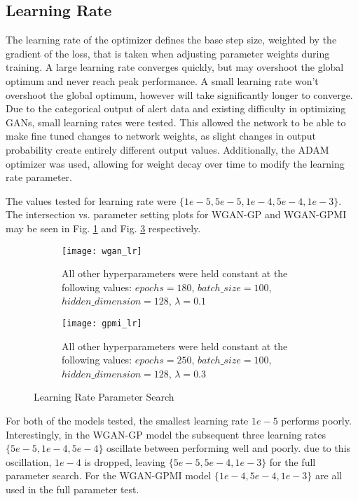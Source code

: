 \subsection{Learning Rate}
\label{sec:lr}

The learning rate of the optimizer defines the base step size, weighted by the gradient of the loss, that is taken when adjusting parameter weights during training. A large learning rate converges quickly, but may overshoot the global optimum and never reach peak performance. A small learning rate won't overshoot the global optimum, however will take significantly longer to converge. Due to the categorical output of alert data and existing difficulty in optimizing GANs, small learning rates were tested. This allowed the network to be able to make fine tuned changes to network weights, as slight changes in output probability create entirely different output values. Additionally, the ADAM optimizer was used, allowing for weight decay over time to modify the learning rate parameter.


The values tested for learning rate were $\{1e-5, 5e-5, 1e-4, 5e-4, 1e-3\}$. The intersection vs. parameter setting plots for WGAN-GP and WGAN-GPMI may be seen in Fig. \ref{fig:wgan_lr} and Fig. \ref{fig:gpmi_lr} respectively.

\begin{figure}[!htbp]
	\centering
	\begin{subfigure}{.7\textwidth}
		\texttt{[image: wgan\_lr]}
	\end{subfigure}%
	\begin{subfigure}{.3\textwidth}
		\caption{
			All other hyperparameters were held constant at the following values: $epochs=180$, $batch\_size = 100$, $hidden\_dimension=128$, $\lambda=0.1$
		}
		\label{fig:wgan_lr}
	\end{subfigure}%

	\begin{subfigure}{.7\textwidth}
		\texttt{[image: gpmi\_lr]}
	\end{subfigure}%
	\begin{subfigure}{.3\textwidth}
		\caption{
			All other hyperparameters were held constant at the following values: $epochs=250$, $batch\_size=100$, $hidden\_dimension=128$, $\lambda=0.3$
		}
		\label{fig:gpmi_lr}
	\end{subfigure}%
	\caption{Learning Rate Parameter Search}
\end{figure}

For both of the models tested, the smallest learning rate $1e-5$ performs poorly. Interestingly, in the WGAN-GP model the subsequent three learning rates $\{5e-5,1e-4,5e-4\}$ oscillate between performing well and poorly. due to this oscillation, $1e-4$ is dropped, leaving $\{5e-5,5e-4,1e-3\}$ for the full parameter search. For the WGAN-GPMI model $\{1e-4, 5e-4, 1e-3\}$ are all used in the full parameter test.


